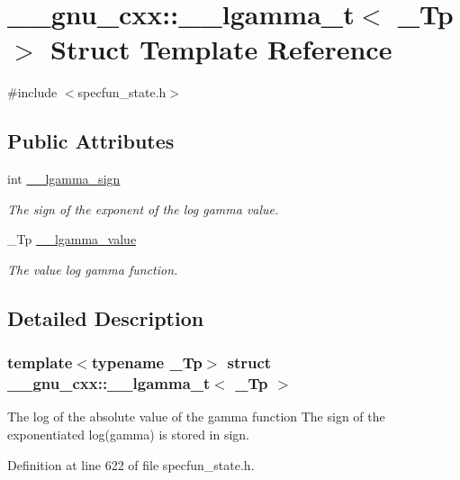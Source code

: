 \hypertarget{struct____gnu__cxx_1_1____lgamma__t}{}\section{\+\_\+\+\_\+gnu\+\_\+cxx\+:\+:\+\_\+\+\_\+lgamma\+\_\+t$<$ \+\_\+\+Tp $>$ Struct Template Reference}
\label{struct____gnu__cxx_1_1____lgamma__t}


{\ttfamily \#include $<$specfun\+\_\+state.\+h$>$}

\subsection*{Public Attributes}
\begin{DoxyCompactItemize}
\item 
int \hyperlink{struct____gnu__cxx_1_1____lgamma__t_a8aecdc9e5f69e729e96dc50f0c57b331}{\+\_\+\+\_\+lgamma\+\_\+sign}
\begin{DoxyCompactList}\small\item\em The sign of the exponent of the log gamma value. \end{DoxyCompactList}\item 
\+\_\+\+Tp \hyperlink{struct____gnu__cxx_1_1____lgamma__t_a916af5560acafd8dcf25c42fd28deef5}{\+\_\+\+\_\+lgamma\+\_\+value}
\begin{DoxyCompactList}\small\item\em The value log gamma function. \end{DoxyCompactList}\end{DoxyCompactItemize}


\subsection{Detailed Description}
\subsubsection*{template$<$typename \+\_\+\+Tp$>$\newline
struct \+\_\+\+\_\+gnu\+\_\+cxx\+::\+\_\+\+\_\+lgamma\+\_\+t$<$ \+\_\+\+Tp $>$}

The log of the absolute value of the gamma function The sign of the exponentiated log(gamma) is stored in sign. 

Definition at line 622 of file specfun\+\_\+state.\+h.




